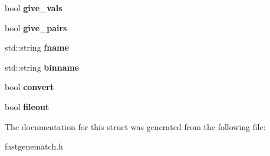 \begin{DoxyCompactItemize}
\item 
\hypertarget{structfastgenematch_1_1Genematcher_1_1params_ab3fce4dd57241d4c0f27fd13866c3a6e}{
bool {\bfseries give\_\-vals}}
\label{structfastgenematch_1_1Genematcher_1_1params_ab3fce4dd57241d4c0f27fd13866c3a6e}

\item 
\hypertarget{structfastgenematch_1_1Genematcher_1_1params_a9aa5e818a4b9b22667c675c652046ba2}{
bool {\bfseries give\_\-pairs}}
\label{structfastgenematch_1_1Genematcher_1_1params_a9aa5e818a4b9b22667c675c652046ba2}

\item 
\hypertarget{structfastgenematch_1_1Genematcher_1_1params_a13581b681e428bd1109e1d952faa803a}{
std::string {\bfseries fname}}
\label{structfastgenematch_1_1Genematcher_1_1params_a13581b681e428bd1109e1d952faa803a}

\item 
\hypertarget{structfastgenematch_1_1Genematcher_1_1params_a03105d36fbe64f6dc2b38c82e57e76f4}{
std::string {\bfseries binname}}
\label{structfastgenematch_1_1Genematcher_1_1params_a03105d36fbe64f6dc2b38c82e57e76f4}

\item 
\hypertarget{structfastgenematch_1_1Genematcher_1_1params_afa74b1a4c19be53b61aac3e6fff59855}{
bool {\bfseries convert}}
\label{structfastgenematch_1_1Genematcher_1_1params_afa74b1a4c19be53b61aac3e6fff59855}

\item 
\hypertarget{structfastgenematch_1_1Genematcher_1_1params_adbf4e2c1fc035d3f5d62519d91a814ca}{
bool {\bfseries fileout}}
\label{structfastgenematch_1_1Genematcher_1_1params_adbf4e2c1fc035d3f5d62519d91a814ca}

\end{DoxyCompactItemize}


The documentation for this struct was generated from the following file:\begin{DoxyCompactItemize}
\item 
fastgenematch.h\end{DoxyCompactItemize}

